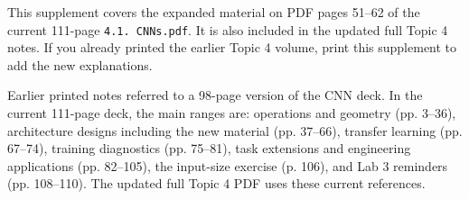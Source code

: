 \documentclass[11pt]{article}
\begin{document}
\tableofcontents\clearpage
This supplement covers the expanded material on PDF pages 51--62 of the current 111-page \texttt{4.1. CNNs.pdf}. It is also included in the updated full Topic 4 notes. If you already printed the earlier Topic 4 volume, print this supplement to add the new explanations.

Earlier printed notes referred to a 98-page version of the CNN deck. In the current 111-page deck, the main ranges are: operations and geometry (pp. 3--36), architecture designs including the new material (pp. 37--66), transfer learning (pp. 67--74), training diagnostics (pp. 75--81), task extensions and engineering applications (pp. 82--105), the input-size exercise (p. 106), and Lab 3 reminders (pp. 108--110). The updated full Topic 4 PDF uses these current references.
\end{document}
